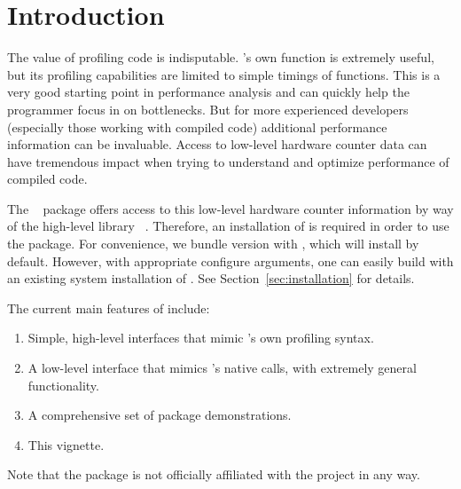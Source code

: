 \section{Introduction}
\label{sec:introduction}

The value of profiling code is indisputable.  \R's own  function 
is extremely useful, but its profiling capabilities are limited to simple 
timings of \R functions. This is a very good starting point in performance 
analysis and can quickly help the \R programmer focus in on bottlenecks.  But 
for more experienced developers (especially those working with compiled code) 
additional performance information can be invaluable. Access to low-level 
hardware counter data can have tremendous impact when trying to understand and 
optimize performance of compiled code. 

The \thispackage~\citep{Schmidt2014pbdPAPIpackage} package offers access to  
this low-level hardware counter information by way of the high-level \C library 
\PAPI~\citep{mucci1999papi}.  Therefore, an installation of \PAPI is required in 
order to use the package.  For convenience, we bundle \PAPI version \PAPIversion 
with \thispackage, which will install by default.  However, with appropriate 
configure arguments, one can easily build \thispackage with an existing system 
installation of \PAPI.  See Section~\ref{sec:installation} for details.

The current main features of \thispackage include:
\begin{enumerate}
  \item Simple, high-level interfaces that mimic \R's own profiling syntax.
  \item A low-level interface that mimics \PAPI's native calls, with extremely 
  general functionality.
  \item A comprehensive set of package demonstrations.
  \item This vignette.
\end{enumerate}

Note that the  package is not officially affiliated with the 
 project in any way.